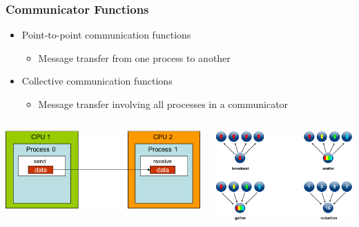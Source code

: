 \documentclass[10pt,t]{beamer}
\begin{document}
\begin{frame}
  \frametitle{Communicator Functions}
  \begin{itemize}
  \item Point-to-point communication functions
    \begin{itemize}
    \item Message transfer from one process to another
    \end{itemize}
  \item Collective communication functions 
    \begin{itemize}
    \item Message transfer involving all processes in a communicator
    \end{itemize}
  \end{itemize}
  \begin{columns}
    \begin{center}
      \includegraphics[width=\textwidth]{./SimpleSendAndRecv}
    \end{center}
    \begin{center}
      \includegraphics[width=\textwidth]{./collective_comm}
    \end{center}
  \end{columns}
\end{frame}
\end{document}
